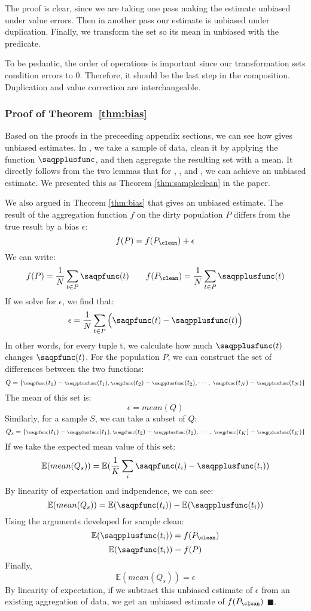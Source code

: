 The proof is clear, since we are taking one pass making the estimate unbiased under value errors.
Then in another pass our estimate is unbiased under duplication.
Finally, we transform the set so its mean in unbiased with the predicate.

To be pedantic, the order of operations is important since our transformation sets condition errors to $0$.
Therefore, it should be the last step in the composition.
Duplication and value correction are interchangeable.

\subsubsection{Proof of Theorem~\ref{thm:bias}}\label{app:proof4}
Based on the proofs in the preceeding appendix sections, we can see how \sampleclean gives unbiased estimates.
In \sampleclean, we take a sample of data, clean it by applying the function $\saqpplusfunc$, and then aggregate the resulting set with a mean.
It directly follows from the two lemmas that for \sumfunc, \countfunc, and \avgfunc, we can achieve an unbiased estimate.
We presented this as Theorem \ref{thm:sampleclean} in the paper.

We also argued in Theorem \ref{thm:bias} that \bias gives an unbiased estimate.
The result of the aggregation function $f$ on the dirty population $P$ differs from the true result by a bias $\epsilon$:
\[f(P) = f(P_{\clean}) + \epsilon\]
We can write:
\begin{equation}
f(P) = \frac{1}{N}\sum_{t\in P}\saqpfunc(t)\hspace{2em}
f(P_{\clean}) = \frac{1}{N}\sum_{t\in P}\saqpplusfunc(t)
\end{equation}
If we solve for $\epsilon$, we find that:
\begin{equation}
\epsilon = \frac{1}{N}\sum_{t\in P}\Big(\saqpfunc(t)-\saqpplusfunc(t)\Big)
\end{equation}
In other words, for every tuple t, we calculate how much $\saqpplusfunc(t)$ changes $\saqpfunc(t)$.
For the population $P$, we can construct the set of differences between the two functions:
\[\scriptsize
Q=\{\saqpfunc(t_1)-\saqpplusfunc(t_1),\saqpfunc(t_2)-\saqpplusfunc(t_2), \cdots ,\ \saqpfunc(t_N)-\saqpplusfunc(t_N)\}
\]
The mean of this set is:
\[
\epsilon = mean(Q)
\]
Similarly, for a sample $S$, we can take a subset of $Q$:
\[\scriptsize
Q_s=\{\saqpfunc(t_1)-\saqpplusfunc(t_1),\saqpfunc(t_2)-\saqpplusfunc(t_2), \cdots ,\ \saqpfunc(t_K)-\saqpplusfunc(t_K)\}
\]
If we take the expected mean value of this set:
\[
\mathbb{E}(mean(Q_s))=\mathbb{E}(\frac{1}{K}\sum_i\saqpfunc(t_i)-\saqpplusfunc(t_i))
\]
By linearity of expectation and indpendence, we can see:
\[
\mathbb{E}(mean(Q_s))=\mathbb{E}(\saqpfunc(t_i))-\mathbb{E}(\saqpplusfunc(t_i))
\]
Using the arguments developed for sample clean:
\[
\mathbb{E}(\saqpplusfunc(t_i)) = f(P_{\clean}) 
\]
\[
\mathbb{E}(\saqpfunc(t_i)) = f(P) 
\]
Finally,
\[
\mathbb{E}(mean(Q_s))=\epsilon
\]
By linearity of expectation, if we subtract this unbiased estimate of $\epsilon$
from an existing aggregation of data, we get an unbiased estimate of $f(P_{\clean})$ $\blacksquare$.

